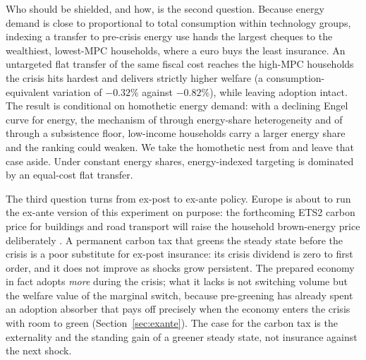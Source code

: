 Who should be shielded, and how, is the second question. Because energy demand is
close to proportional to total consumption within technology groups, indexing a
transfer to pre-crisis energy use hands the largest cheques to the wealthiest,
lowest-MPC households, where a euro buys the least insurance. An untargeted flat
transfer of the same fiscal cost reaches the high-MPC households the crisis hits
hardest and delivers strictly higher welfare (a consumption-equivalent variation of
$-0.32\%$ against $-0.82\%$), while leaving adoption intact. The result is
conditional on homothetic energy demand: with a declining Engel curve for
energy, the mechanism of \citet{Bayer2026} through energy-share heterogeneity and
of \citet{Langot2026} through a subsistence floor, low-income households carry a
larger energy share and the ranking could weaken. We take the homothetic nest from
\citet{ARS2024} and leave that case aside. Under constant energy shares,
energy-indexed targeting is dominated by an equal-cost flat transfer.

The third question turns from ex-post to ex-ante policy. Europe is about to run the
ex-ante version of this experiment on purpose: the forthcoming ETS2 carbon price for
buildings and road transport will raise the household brown-energy price deliberately
\citep{ECETS2}. A permanent carbon tax
that greens the steady state before the crisis is a poor substitute for ex-post
insurance: its crisis dividend is zero to first order, and it does not improve as
shocks grow persistent. The prepared economy in fact adopts \emph{more} during the
crisis; what it lacks is not switching volume but the welfare value of the marginal
switch, because pre-greening has already spent an adoption absorber that pays off
precisely when the economy enters the crisis with room to green
(Section~\ref{sec:exante}). The case for the carbon tax is the externality and the
standing gain of a greener steady state, not insurance against the next shock.

